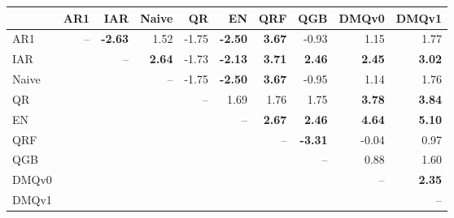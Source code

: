 \begin{tabular}{lrrrrrrrrr}
\toprule
 & AR1 & IAR & Naive & QR & EN & QRF & QGB & DMQv0 & DMQv1 \\
\midrule
AR1 & -- & \textbf{-2.63} & 1.52 & -1.75 & \textbf{-2.50} & \textbf{3.67} & -0.93 & 1.15 & 1.77 \\
IAR &  & -- & \textbf{2.64} & -1.73 & \textbf{-2.13} & \textbf{3.71} & \textbf{2.46} & \textbf{2.45} & \textbf{3.02} \\
Naive &  &  & -- & -1.75 & \textbf{-2.50} & \textbf{3.67} & -0.95 & 1.14 & 1.76 \\
QR &  &  &  & -- & 1.69 & 1.76 & 1.75 & \textbf{3.78} & \textbf{3.84} \\
EN &  &  &  &  & -- & \textbf{2.67} & \textbf{2.46} & \textbf{4.64} & \textbf{5.10} \\
QRF &  &  &  &  &  & -- & \textbf{-3.31} & -0.04 & 0.97 \\
QGB &  &  &  &  &  &  & -- & 0.88 & 1.60 \\
DMQv0 &  &  &  &  &  &  &  & -- & \textbf{2.35} \\
DMQv1 &  &  &  &  &  &  &  &  & -- \\
\bottomrule
\end{tabular}
